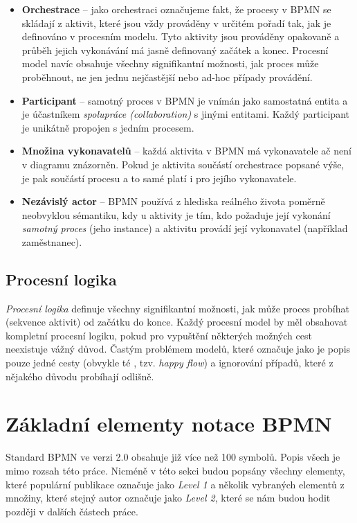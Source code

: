 \begin{itemize}
\item \textbf{Orchestrace} – jako orchestraci označujeme fakt, že procesy v BPMN se skládají z aktivit, které jsou vždy prováděny v určitém pořadí tak, jak je definováno v procesním modelu. Tyto aktivity jsou prováděny opakovaně a průběh jejich vykonávání má jasně definovaný začátek a konec. Procesní model navíc obsahuje všechny signifikantní možnosti, jak proces může proběhnout, ne jen jednu nejčastější nebo ad-hoc případy provádění.
\item \textbf{Participant} – samotný proces v BPMN je vnímán jako samostatná entita a je účastníkem \textit{spolupráce (collaboration)} s jinými entitami. Každý participant je unikátně propojen s jedním procesem.
\item \textbf{Množina vykonavatelů} – každá aktivita v BPMN má vykonavatele ač není v diagramu znázorněn. Pokud je aktivita součástí orchestrace popsané výše, je pak součástí procesu a to samé platí i pro jejího vykonavatele.
\item \textbf{Nezávislý actor} – BPMN používá z hlediska reálného života poměrně neobvyklou sémantiku, kdy u aktivity je tím, kdo požaduje její vykonání \textit{samotný proces} (jeho instance) a aktivitu provádí její vykonavatel (například zaměstnanec).
\end{itemize}

\subsection{Procesní logika}
\textit{Procesní logika} definuje všechny signifikantní možnosti, jak může proces probíhat (sekvence aktivit) od začátku do konce. Každý procesní model by měl obsahovat kompletní procesní logiku, pokud pro vypuštění některých možných cest neexistuje vážný důvod. Častým problémem modelů, které \cite{Silver2011} označuje jako  je popis pouze jedné cesty (obvykle té , tzv. \textit{happy flow}) a ignorování případů, které z nějakého důvodu probíhají odlišně.

\section{Základní elementy notace BPMN}

Standard BPMN ve verzi 2.0 obsahuje již více než 100 symbolů. Popis všech je mimo rozsah této práce. Nicméně v této sekci budou popsány všechny elementy, které populární publikace \cite{Silver2011} označuje jako \textit{Level 1} a několik vybraných elementů z množiny, které stejný autor označuje jako \textit{Level 2}, které se nám budou hodit později v dalších částech práce.

